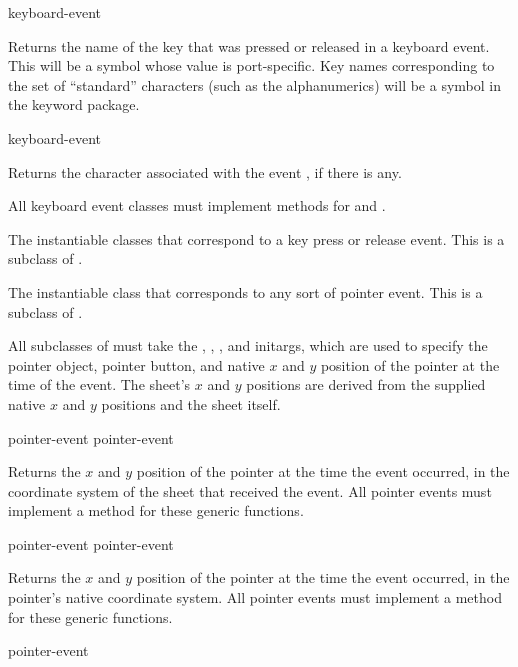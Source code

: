  {keyboard-event}

Returns the name of the key that was pressed or released in a keyboard event.
This will be a symbol whose value is port-specific.  Key names corresponding to
the set of ``standard'' characters (such as the alphanumerics) will be a symbol
in the keyword package.

 {keyboard-event}

Returns the character associated with the event , if there
is any.

All keyboard event classes must implement methods for
 and .

 
The instantiable classes that correspond to a key press or release event.  This
is a subclass of .


 
The instantiable class that corresponds to any sort of pointer event.  This is a
subclass of .

All subclasses of  must take the , ,
, and  initargs, which are used to specify the pointer object,
pointer button, and native $x$ and $y$ position of the pointer at the time of
the event.  The sheet's $x$ and $y$ positions are derived from the supplied
native $x$ and $y$ positions and the sheet itself.

 {pointer-event}
 {pointer-event}

Returns the $x$ and $y$ position of the pointer at the time the event occurred,
in the coordinate system of the sheet that received the event.  All pointer
events must implement a method for these generic functions.

 {pointer-event}
 {pointer-event}

Returns the $x$ and $y$ position of the pointer at the time the event occurred,
in the pointer's native coordinate system.  All pointer events must implement a
method for these generic functions.

 {pointer-event}

